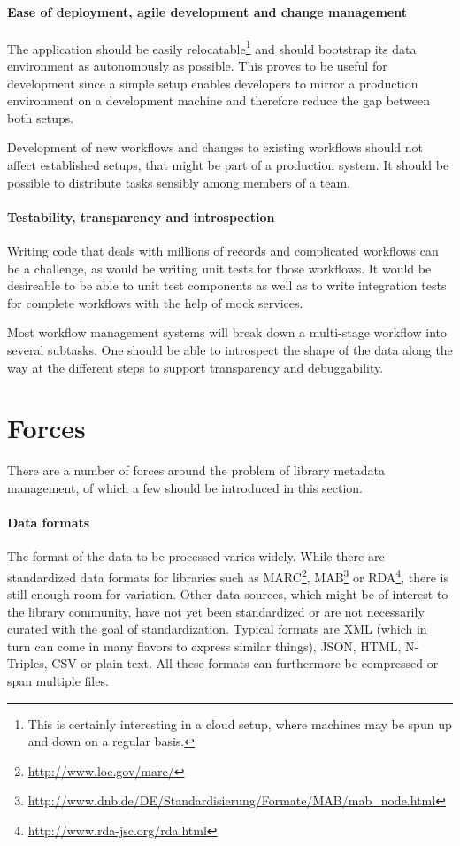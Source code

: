 \documentclass[english]{lni}
\begin{document}
\paragraph{Ease of deployment, agile development and change management} The application
should be easily relocatable\footnote{This is certainly interesting in a cloud setup,
where machines may be spun up and down on a regular basis.}
and should bootstrap its
data environment as autonomously as possible. This proves to be useful
for development since a simple setup enables developers to
mirror a production environment on a development machine and therefore
reduce the gap between both setups.

Development of new workflows
and changes to existing workflows should not affect established setups, that
might be part of a production system. It should be possible to distribute
tasks sensibly among members of a team.

\paragraph{Testability, transparency and introspection}
Writing code that deals with millions of records and complicated workflows
can be a challenge, as would be writing unit tests for those workflows. It would
be desireable to be able to unit test components as well as to write integration
tests for complete workflows with the help of mock services.

Most workflow
management systems will break down a multi-stage workflow into
several subtasks. One should be able to introspect the shape of the
data along the way at the different steps to support transparency and debuggability.

\section{Forces}
\label{forces}

There are a number of forces around the problem of library metadata management,
of which a few should be introduced in this section.

\paragraph{Data formats}

The format of the data to be processed varies widely. While there are standardized data
formats for libraries such as MARC\footnote{\url{http://www.loc.gov/marc/}},
MAB\footnote{\url{http://www.dnb.de/DE/Standardisierung/Formate/MAB/mab_node.html}} or RDA\footnote{\url{http://www.rda-jsc.org/rda.html}},
there is still enough room for variation. Other data sources, which
might be of interest to the library community, have not yet been
standardized or are not necessarily curated with the goal of standardization.
Typical formats are XML (which in turn can come in many flavors to
express similar things), JSON, HTML, N-Triples, CSV or plain text. All
these formats can furthermore be compressed or span multiple files.
\end{document}
